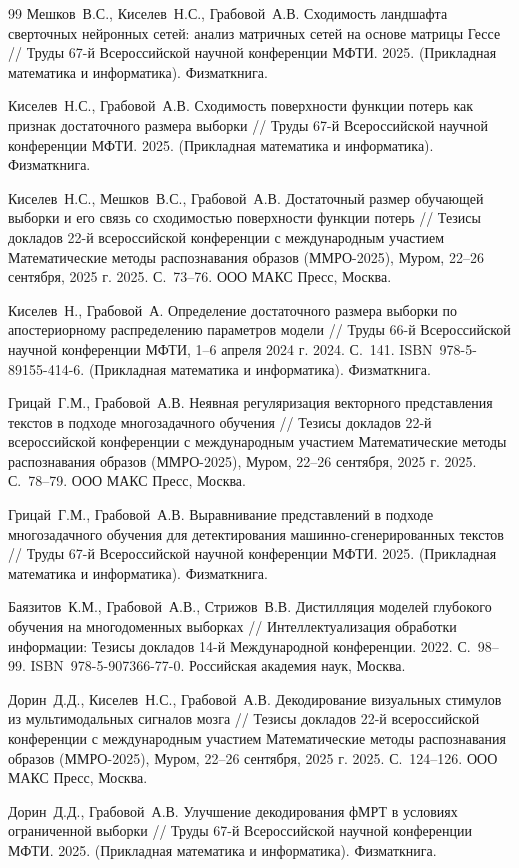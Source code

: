 \documentclass{dissert}
\def\oldbibitem{} \let\oldbibitem=\bibitem
\def\bibitem{\stepcounter{citnum}\oldbibitem}
\begin{document}
\begin{thebibliography}{99}
	Мешков~В.\;С., Киселев~Н.\;С., Грабовой~А.\;В. Сходимость ландшафта сверточных нейронных сетей: анализ матричных сетей на основе матрицы Гессе // Труды 67-й Всероссийской научной конференции МФТИ. 2025. (Прикладная математика и информатика). Физматкнига.

	Киселев~Н.\;С., Грабовой~А.\;В. Сходимость поверхности функции потерь как признак достаточного размера выборки // Труды 67-й Всероссийской научной конференции МФТИ. 2025. (Прикладная математика и информатика). Физматкнига.

	Киселев~Н.\;С., Мешков~В.\;С., Грабовой~А.\;В. Достаточный размер обучающей выборки и его связь со сходимостью поверхности функции потерь // Тезисы докладов 22-й всероссийской конференции с международным участием {\flqq}Математические методы распознавания образов (ММРО-2025){\frqq}, Муром, 22–26 сентября, 2025 г. 2025. С.~73–76. ООО {\dq}МАКС Пресс{\dq}, Москва.

	Киселев~Н., Грабовой~А. Определение достаточного размера выборки по апостериорному распределению параметров модели // Труды 66-й Всероссийской научной конференции МФТИ, 1–6 апреля 2024 г. 2024. С.~141. ISBN~978-5-89155-414-6. (Прикладная математика и информатика). Физматкнига.

	Грицай~Г.\;М., Грабовой~А.\;В. Неявная регуляризация векторного представления текстов в подходе многозадачного обучения // Тезисы докладов 22-й всероссийской конференции с международным участием {\flqq}Математические методы распознавания образов (ММРО-2025){\frqq}, Муром, 22–26 сентября, 2025 г. 2025. С.~78–79. ООО {\dq}МАКС Пресс{\dq}, Москва.

	Грицай~Г.\;М., Грабовой~А.\;В. Выравнивание представлений в подходе многозадачного обучения для детектирования машинно-сгенерированных текстов // Труды 67-й Всероссийской научной конференции МФТИ. 2025. (Прикладная математика и информатика). Физматкнига.

	Баязитов~К.\;М., Грабовой~А.\;В., Стрижов~В.\;В. Дистилляция моделей глубокого обучения на многодоменных выборках // Интеллектуализация обработки информации: Тезисы докладов 14-й Международной конференции. 2022. С.~98–99. ISBN~978-5-907366-77-0. Российская академия наук, Москва.

	Дорин~Д.\;Д., Киселев~Н.\;С., Грабовой~А.\;В. Декодирование визуальных стимулов из мультимодальных сигналов мозга // Тезисы докладов 22-й всероссийской конференции с международным участием {\flqq}Математические методы распознавания образов (ММРО-2025){\frqq}, Муром, 22–26 сентября, 2025 г. 2025. С.~124–126. ООО {\dq}МАКС Пресс{\dq}, Москва.

	Дорин~Д.\;Д., Грабовой~А.\;В. Улучшение декодирования фМРТ в условиях ограниченной выборки // Труды 67-й Всероссийской научной конференции МФТИ. 2025. (Прикладная математика и информатика). Физматкнига.

\end{thebibliography}
\end{document}
